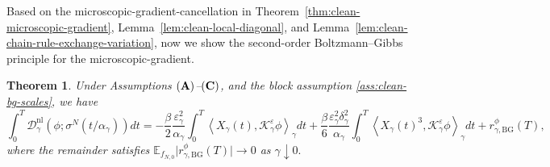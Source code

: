 \documentclass{article}
\newtheorem{theorem}{Theorem}
\begin{document}
Based on the microscopic-gradient-cancellation in Theorem~\ref{thm:clean-microscopic-gradient},  Lemma~\ref{lem:clean-local-diagonal}, and Lemma~\ref{lem:clean-chain-rule-exchange-variation}, now we show the second-order Boltzmann–Gibbs principle for the microscopic-gradient.

\begin{theorem}\label{cor:clean-nonlinear-drift}
Under Assumptions \(({\bf A})\)--\(({\bf C})\), and the block assumption \eqref{ass:clean-bg-scales}, we have
\begin{equation}
    \int_0^T
\mathcal D_\gamma^{\mathrm{nl}}(\phi;\sigma^N(t/\alpha_\gamma))dt =  -\frac{\beta }{2}
\frac{\varepsilon_\gamma^2}{\alpha_\gamma}
\int_0^T
\left\langle
X_\gamma(t),
\mathcal K_\gamma^\varepsilon\phi
\right\rangle_\gamma dt 
+ \frac{\beta}{6}
\frac{\varepsilon_\gamma^2\delta_\gamma^2}{\alpha_\gamma}
\int_0^T
\left\langle
X_\gamma(t)^3,
\mathcal K_\gamma^\varepsilon\phi
\right\rangle_\gamma dt + r_{\gamma,\mathrm{BG}}^\phi(T),
\end{equation}
where the remainder satisfies
\(
\mathbb E_{f_{N,0}}
\bigl|r_{\gamma,\mathrm{BG}}^\phi(T)\bigr|
\longrightarrow 0\) as \(\gamma\downarrow0.\)
\end{theorem}
\end{document}
